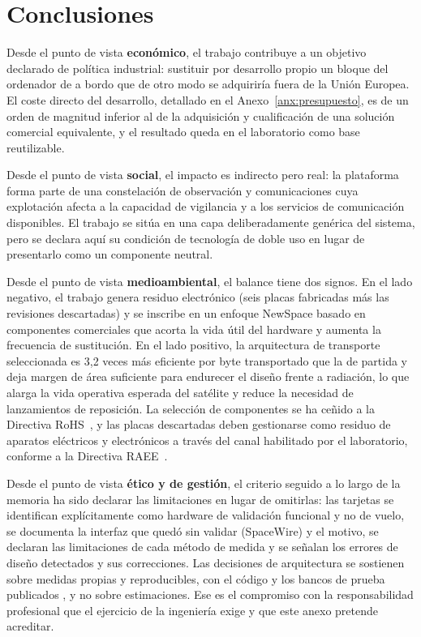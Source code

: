 \section{Conclusiones}
\normalsize{%
Desde el punto de vista \textbf{económico}, el trabajo contribuye a un objetivo declarado de
política industrial: sustituir por desarrollo propio un bloque del ordenador de a bordo que de otro
modo se adquiriría fuera de la Unión Europea. El coste directo del desarrollo, detallado en el
Anexo~\ref{anx:presupuesto}, es de un orden de magnitud inferior al de la adquisición y cualificación de una solución
comercial equivalente, y el resultado queda en el laboratorio como base reutilizable.

Desde el punto de vista \textbf{social}, el impacto es indirecto pero real: la plataforma forma
parte de una constelación de observación y comunicaciones cuya explotación afecta a la capacidad de
vigilancia y a los servicios de comunicación disponibles. El trabajo se sitúa en una capa
deliberadamente genérica del sistema, pero se declara aquí su condición de tecnología de doble uso
en lugar de presentarlo como un componente neutral.

Desde el punto de vista \textbf{medioambiental}, el balance tiene dos signos. En el lado negativo,
el trabajo genera residuo electrónico (seis placas fabricadas más las revisiones descartadas) y se
inscribe en un enfoque NewSpace basado en componentes comerciales que acorta la vida útil del
hardware y aumenta la frecuencia de sustitución. En el lado positivo, la arquitectura de transporte
seleccionada es 3,2 veces más eficiente por byte transportado que la de partida y deja margen de
área suficiente para endurecer el diseño frente a radiación, lo que alarga la vida operativa
esperada del satélite y reduce la necesidad de lanzamientos de reposición. La selección de
componentes se ha ceñido a la Directiva RoHS~\cite{ue2011rohs}, y las placas descartadas deben
gestionarse como residuo de aparatos eléctricos y electrónicos a través del canal habilitado por el
laboratorio, conforme a la Directiva RAEE~\cite{ue2012weee}.

Desde el punto de vista \textbf{ético y de gestión}, el criterio seguido a lo largo de la memoria
ha sido declarar las limitaciones en lugar de omitirlas: las tarjetas se identifican explícitamente
como hardware de validación funcional y no de vuelo, se documenta la interfaz que quedó sin validar
(SpaceWire) y el motivo, se declaran las limitaciones de cada método de medida y se señalan los
errores de diseño detectados y sus correcciones. Las decisiones de arquitectura se sostienen sobre
medidas propias y reproducibles, con el código y los bancos de prueba publicados
\cite{repo_tfm}, y no sobre estimaciones. Ese es el compromiso con la responsabilidad profesional
que el ejercicio de la ingeniería exige y que este anexo pretende acreditar.
}
